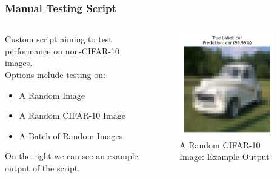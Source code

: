 \documentclass{beamer}
\begin{document}
\begin{frame}
\frametitle{Manual Testing Script}
\begin{columns}[t]
    \begin{column}{0.5\textwidth}    
        Custom script aiming to test performance on non-CIFAR-10 images.\\
        Options include testing on:
        \begin{itemize}
            \item A Random Image
            \item A Random CIFAR-10 Image
            \item A Batch of Random Images
        \end{itemize}
        On the right we can see an example output of the script.
    \end{column}

    \begin{column}{0.5\textwidth}
        \begin{figure}
            \centering
            \vspace{-1cm}
            \includegraphics[width=0.9\textwidth]{media/random_cifar.png}
            \vspace{-0.3cm}
            \caption{A Random CIFAR-10 Image: Example Output}
        \end{figure}
    \end{column}
\end{columns}
\end{frame}
\end{document}
